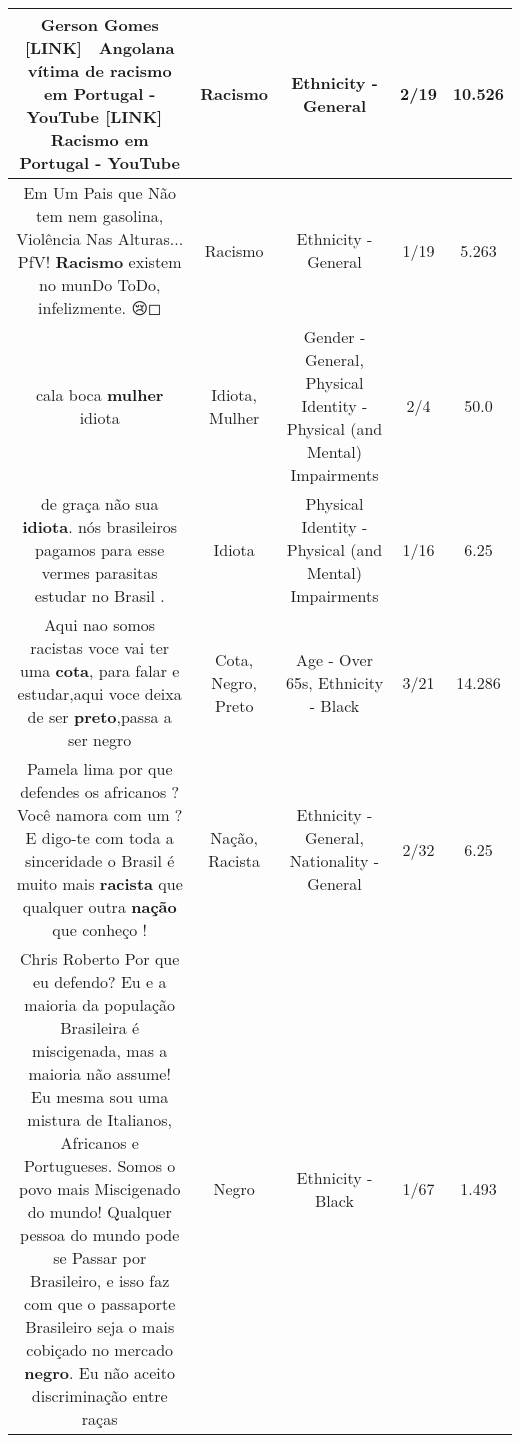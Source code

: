 \documentclass[11pt]{article}
\newlength\mylength
\begin{document}
\begin{center}
\begin{longtable}{|C{.65\mylength}|C{.30\mylength}|C{.12\mylength}|C{.12\mylength}|C{.12\mylength}|}
  \small Gerson Gomes  [LINK] 🎥 Angolana vítima de \textbf{racismo} em Portugal - YouTube [LINK] 🎥 \textbf{Racismo} em Portugal - YouTube\normalsize   & Racismo & Ethnicity - General & 2/19 & 10.526 \\  \hline
  \small Em Um Pais que Não tem nem gasolina, Violência Nas Alturas... PfV! \textbf{Racismo} existem no munDo ToDo, infelizmente. 😢◻\normalsize   & Racismo & Ethnicity - General & 1/19 & 5.263 \\  \hline
  \small cala boca \textbf{mulher} idiota\normalsize   & Idiota, Mulher & Gender - General, Physical Identity - Physical (and Mental) Impairments & 2/4 & 50.0 \\  \hline
  \small de graça não sua  \textbf{idiota}. nós brasileiros pagamos para esse vermes parasitas estudar no Brasil .\normalsize   & Idiota & Physical Identity - Physical (and Mental) Impairments & 1/16 & 6.25 \\  \hline
  \small Aqui nao somos racistas voce vai ter uma \textbf{cota}, para falar e estudar,aqui voce deixa de ser \textbf{preto},passa a ser negro\normalsize   & Cota, Negro, Preto & Age - Over 65s, Ethnicity - Black & 3/21 & 14.286 \\  \hline
  \small Pamela lima por que defendes os africanos ? Você namora com um ? E digo-te com toda a sinceridade o Brasil é muito mais \textbf{racista} que qualquer outra \textbf{nação} que conheço !\normalsize   & Nação, Racista & Ethnicity - General, Nationality - General & 2/32 & 6.25 \\  \hline
  \small Chris Roberto Por que eu defendo? Eu e a maioria da população Brasileira é miscigenada, mas a maioria não assume! Eu mesma sou uma mistura de Italianos, Africanos e Portugueses. Somos o povo mais Miscigenado do mundo! Qualquer pessoa do mundo pode se Passar por Brasileiro, e isso faz com que o passaporte Brasileiro seja o mais cobiçado no mercado \textbf{negro}. Eu não aceito discriminação entre raças\normalsize   & Negro & Ethnicity - Black & 1/67 & 1.493 \\  \hline

\end{longtable}
\end{center}
\end{document}
